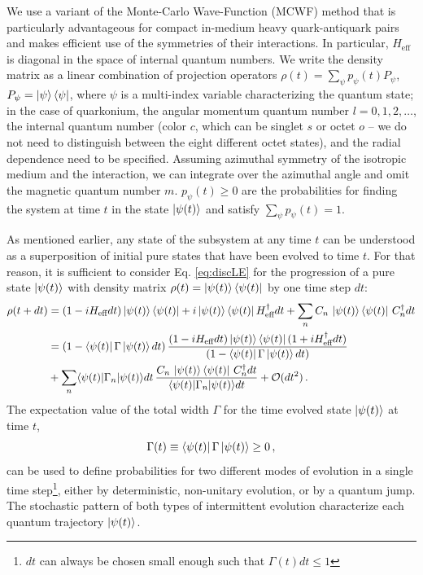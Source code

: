 \documentclass[times,sort&compress,final]{elsarticle}
\begin{document}
We use a variant of the Monte-Carlo Wave-Function (MCWF) method \cite{Dalibard:1992zz} that is particularly advantageous for compact in-medium heavy quark-antiquark pairs 
and makes efficient use of the symmetries of their interactions. 
In particular, $H_\text{eff}$ is diagonal in the space of internal quantum numbers. 
We write the density matrix as a linear combination of projection operators 
$\rho(t) = \sum_{\psi} p_\psi(t) P_\psi$, $P_\psi=\ket{\psi} \bra{\psi}$, 
where $\psi$ is a multi-index variable characterizing the quantum state; in the case of quarkonium, 
the angular momentum quantum number $l=0,1,2,\ldots$, the internal quantum number 
(color $c$, which can be singlet $s$ or octet $o$ -- we do not need to distinguish 
between the eight different octet states), and the radial dependence need to be specified.
Assuming azimuthal symmetry of the isotropic medium and the interaction, we can 
integrate over the azimuthal angle and omit the magnetic quantum number $m$. 
$p_\psi(t) \ge 0$ are the probabilities for finding the system at time $t$ 
in the state $\ket{\psi(t)}$ and satisfy $\sum_\psi p_\psi(t) =1$. 

As mentioned earlier, any state of the subsystem at any time $t$ can be understood 
as a superposition of initial pure states that have been evolved to time $t$. 
For that reason, it is sufficient to consider Eq. \eqref{eq:discLE} for the progression 
of a pure state $\ket{\psi(t)}$ with density matrix 
$\rho(t) = \ket{\psi(t)}\bra{\psi(t)}$ 
by one time step $dt$:
\begin{align}
\rho(t+dt) 
& = (1-iH_\text{eff}dt)\ket{\psi(t)}\bra{\psi(t)}
  +i\ket{\psi(t)}\bra{\psi(t)}H_\text{eff}^\dagger dt
  +\sum_n C_n\,\ket{\psi(t)}\bra{\psi(t)} \,C_n^\dagger dt\nonumber \\
& = (1-\bra{\psi(t)}\Gamma\ket{\psi(t)} dt) \, 
  \frac{(1-iH_\text{eff}dt)\ket{\psi(t)}\bra{\psi(t)}(1+iH_\text{eff}^\dagger dt)}
  {(1-\bra{\psi(t)}\Gamma\ket{\psi(t)} dt)} 
\nonumber \\& 
  + \sum_n\langle\psi(t)|\Gamma_n|\psi(t)\rangle dt \, \frac{C_n\,\ket{\psi(t)}\bra{\psi(t)} \,C_n^\dagger dt}{\langle\psi(t)|\Gamma_n|\psi(t)\rangle dt}+\mathcal{O}(dt^2)\,.
\label{eq:evol}
\end{align}
The expectation value of the total width $\Gamma$ for the time evolved state $\ket{\psi(t)}$ at time $t$, 
\begin{equation}
\Gamma(t) \equiv \bra{\psi(t)}\Gamma\ket{\psi(t)} \ge 0 \, ,    
\end{equation}
can be used to define probabilities for two different modes of evolution in a single time step\footnote{
$dt$ can always be chosen small enough such that $\Gamma(t) dt \le 1$}, either by deterministic, 
non-unitary evolution, or by a quantum jump. 
The stochastic pattern of both types of intermittent evolution characterize each quantum trajectory $\ket{\psi(t)}$. 
\end{document}
